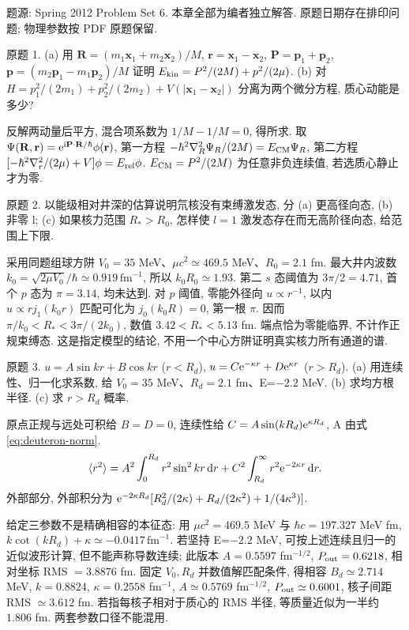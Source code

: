 题源: Spring 2012 Problem Set 6. 本章全部为编者独立解答. 原题日期存在排印问题; 物理参数按 PDF 原题保留.
\begin{exercise}\label{ex:2202-6-1}
原题 1. (a) 用 $\mathbf R=(m_1\mathbf x_1+m_2\mathbf x_2)/M$, $\mathbf r=\mathbf x_1-\mathbf x_2$, $\mathbf P=\mathbf p_1+\mathbf p_2$, $\mathbf p=(m_2\mathbf p_1-m_1\mathbf p_2)/M$ 证明 $E_{\rm kin}=P^2/(2M)+p^2/(2\mu)$. (b) 对 $H=p_1^2/(2m_1)+p_2^2/(2m_2)+V(|\mathbf x_1-\mathbf x_2|)$ 分离为两个微分方程, 质心动能是多少?
\end{exercise}
\begin{solution}
反解两动量后平方, 混合项系数为 $1/M-1/M=0$, 得所求. 取 $\Psi(\mathbf R,\mathbf r)=\mathrm e^{\mathrm i\mathbf P\cdot\mathbf R/\hbar}\phi(\mathbf r)$, 第一方程 $-\hbar^2\nabla_R^2\Psi_R/(2M)=E_{\rm CM}\Psi_R$, 第二方程 $[-\hbar^2\nabla_r^2/(2\mu)+V]\phi=E_{\rm rel}\phi$. $E_{\rm CM}=P^2/(2M)$ 为任意非负连续值, 若选质心静止才为零.
\end{solution}
\begin{exercise}\label{ex:2202-6-2}
原题 2. 以能级相对井深的估算说明氘核没有束缚激发态, 分 (a) 更高径向态, (b) 非零 l; (c) 如果核力范围 $R_*>R_0$, 怎样使 $l=1$ 激发态存在而无高阶径向态, 给范围上下限.
\end{exercise}
\begin{solution}
采用同题组球方阱 $V_0=35$ MeV、$\mu c^2\simeq469.5$ MeV、$R_0=2.1$ fm. 最大井内波数 $k_0=\sqrt{2\mu V_0}/\hbar\simeq0.919\,\mathrm{fm}^{-1}$, 所以 $k_0R_0\simeq1.93$. 第二 $s$ 态阈值为 $3\pi/2=4.71$, 首个 $p$ 态为 $\pi=3.14$, 均未达到. 对 $p$ 阈值, 零能外径向 $u\propto r^{-1}$, 以内 $u\propto rj_1(k_0r)$ 匹配可化为 $j_0(k_0R)=0$, 第一根 $\pi$. 因而
$\pi/k_0<R_*<3\pi/(2k_0)$, 数值 $3.42<R_*<5.13$ fm. 端点恰为零能临界, 不计作正规束缚态. 这是指定模型的结论, 不用一个中心方阱证明真实核力所有通道的谱.
\end{solution}
\begin{exercise}\label{ex:2202-6-3}
原题 3. $u=A\sin kr+B\cos kr$ ($r<R_d$), $u=C\mathrm e^{-\kappa r}+D\mathrm e^{\kappa r}$ ($r>R_d$). (a) 用连续性、归一化求系数, 给 $V_0=35$ MeV、$R_d=2.1$ fm、E=$-2.2$ MeV. (b) 求均方根半径. (c) 求 $r>R_d$ 概率.
\end{exercise}
\begin{solution}
原点正规与远处可积给 $B=D=0$, 连续性给 $C=A\sin(kR_d)\mathrm e^{\kappa R_d}$, A 由式 \eqref{eq:deuteron-norm}. 
\begin{equation*}
 \langle r^2\rangle=A^2\int_0^{R_d}r^2\sin^2kr\,\mathrm d r+C^2\int_{R_d}^\infty r^2\mathrm e^{-2\kappa r}\,\mathrm d r.
\end{equation*}
外部部分, 外部积分为 $\mathrm e^{-2\kappa R_d}[R_d^2/(2\kappa)+R_d/(2\kappa^2)+1/(4\kappa^3)]$.

给定三参数不是精确相容的本征态: 用 $\mu c^2=469.5$ MeV 与 $\hbar c=197.327$ MeV fm, $k\cot(kR_d)+\kappa\simeq-0.0417\,\mathrm{fm}^{-1}$. 若坚持 E=$-2.2$ MeV, 可按上述连续且归一的近似波形计算, 但不能声称导数连续; 此版本 $A=0.5597$ fm$^{-1/2}$, $P_{\rm out}=0.6218$, 相对坐标 RMS $=3.8876$ fm. 固定 $V_0,R_d$ 并数值解匹配条件, 得相容 $B_d\simeq2.714$ MeV, $k=0.8824$, $\kappa=0.2558$ fm$^{-1}$, $A\simeq0.5769$ fm$^{-1/2}$, $P_{\rm out}\simeq0.6001$, 核子间距 RMS $\simeq3.612$ fm. 若指每核子相对于质心的 RMS 半径, 等质量近似为一半约 $1.806$ fm. 两套参数口径不能混用.
\end{solution}
